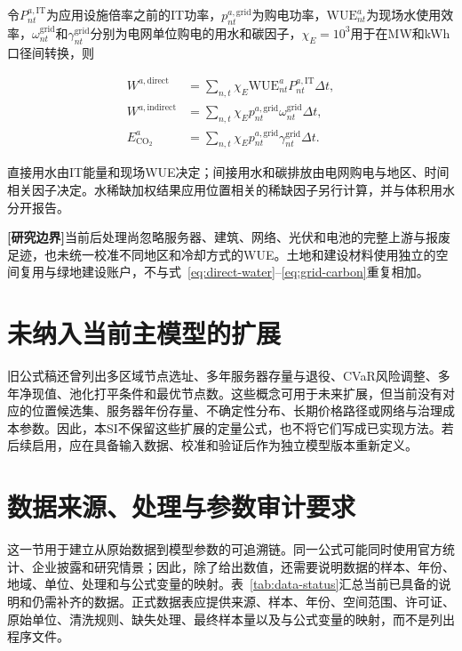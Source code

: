\documentclass[preprint]{elsarticle}
\newcommand{\boundary}{\textcolor{black!65}{\textbf{[研究边界]}}}
\begin{document}
令$P^{a,\mathrm{IT}}_{nt}$为应用设施倍率之前的IT功率，$p^{a,\mathrm{grid}}_{nt}$为购电功率，$\mathrm{WUE}^{a}_{nt}$为现场水使用效率，$\omega^{\mathrm{grid}}_{nt}$和$\gamma^{\mathrm{grid}}_{nt}$分别为电网单位购电的用水和碳因子，$\chi_E=10^3$用于在MW和kWh口径间转换，则

\begin{align}
 W^{a,\mathrm{direct}}
 &=\sum_{n,t}\chi_E\mathrm{WUE}^{a}_{nt}
 P^{a,\mathrm{IT}}_{nt}\Delta t,
 \label{eq:direct-water}\\
 W^{a,\mathrm{indirect}}
 &=\sum_{n,t}\chi_Ep^{a,\mathrm{grid}}_{nt}
 \omega^{\mathrm{grid}}_{nt}\Delta t,
 \label{eq:indirect-water}\\
 E^{a}_{\mathrm{CO_2}}
 &=\sum_{n,t}\chi_Ep^{a,\mathrm{grid}}_{nt}
 \gamma^{\mathrm{grid}}_{nt}\Delta t.
 \label{eq:grid-carbon}
\end{align}

直接用水由IT能量和现场WUE决定；间接用水和碳排放由电网购电与地区、时间相关因子决定。水稀缺加权结果应用位置相关的稀缺因子另行计算，并与体积用水分开报告。

\boundary 当前后处理尚忽略服务器、建筑、网络、光伏和电池的完整上游与报废足迹，也未统一校准不同地区和冷却方式的WUE。土地和建设材料使用独立的空间复用与绿地建设账户，不与式~\eqref{eq:direct-water}--\eqref{eq:grid-carbon}重复相加。

\section{未纳入当前主模型的扩展}

旧公式稿还曾列出多区域节点选址、多年服务器存量与退役、CVaR风险调整、多年净现值、池化打平条件和最优节点数。这些概念可用于未来扩展，但当前没有对应的位置候选集、服务器年份存量、不确定性分布、长期价格路径或网络与治理成本参数。因此，本SI不保留这些扩展的定量公式，也不将它们写成已实现方法。若后续启用，应在具备输入数据、校准和验证后作为独立模型版本重新定义。

\section{数据来源、处理与参数审计要求}

这一节用于建立从原始数据到模型参数的可追溯链。同一公式可能同时使用官方统计、企业披露和研究情景；因此，除了给出数值，还需要说明数据的样本、年份、地域、单位、处理和与公式变量的映射。表~\ref{tab:data-status}汇总当前已具备的说明和仍需补齐的数据。正式数据表应提供来源、样本、年份、空间范围、许可证、原始单位、清洗规则、缺失处理、最终样本量以及与公式变量的映射，而不是列出程序文件。
\end{document}
